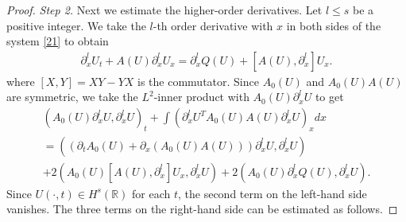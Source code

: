 \documentclass{article}
\theoremstyle{plain}
\begin{document}
\begin{proof}
\emph{Step 2.} Next we estimate the higher-order derivatives. Let $l\le s$ be a positive integer. We take the $l$-th order derivative with $x$ in both sides of the system \eqref{21} to obtain
\begin{eqnarray*}
\partial^l_x U_t + A(U) \partial^l_x U_x = \partial^l_x Q(U) + [A(U),\partial^l_x]U_x.
\end{eqnarray*}
where $[X,Y]=XY-YX$ is the commutator. Since $A_0(U)$ and $A_0(U)A(U)$ are symmetric, we take the $L^2$-inner product with $A_0(U)\partial^l_x U$ to get
\begin{multline}\label{45}
  (A_0(U)\partial^l_x U,\partial^l_x U)_t + \int (\partial^l_x U^T A_0(U)A(U)\partial^l_x U)_x dx \\
  = ((\partial_t A_0(U)+\partial_x(A_0(U)A(U)))\partial^l_x U,\partial^l_x U) \\
  + 2(A_0(U)[A(U),\partial^l_x]U_x,\partial^l_x U) + 2(A_0(U) \partial^l_x Q(U), \partial^l_x U).
\end{multline}
Since $U(\cdot, t)\in H^s(\mathbb{R})$ for each $t$, the second term on the left-hand side vanishes.
The three terms on the right-hand side can be estimated as follows.


\end{proof}
\end{document}
